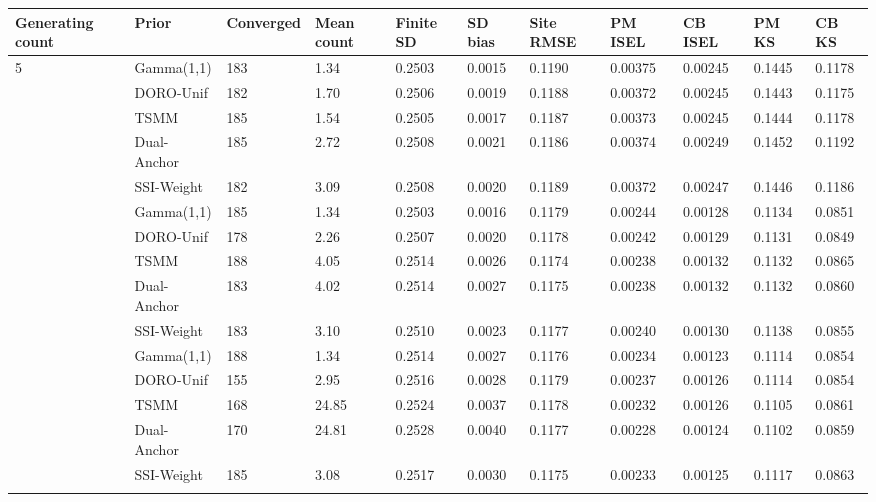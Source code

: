 \begin{longtable}{lllllllllll}
\toprule
Generating count & Prior & Converged & Mean count & Finite SD & SD bias & Site RMSE & PM ISEL & CB ISEL & PM KS & CB KS \\
\midrule\endhead
5 & Gamma(1,1) & 183 & 1.34 & 0.2503 & 0.0015 & 0.1190 & 0.00375 & 0.00245 & 0.1445 & 0.1178 \\ \addlinespace[3pt]
5 & DORO-Unif & 182 & 1.70 & 0.2506 & 0.0019 & 0.1188 & 0.00372 & 0.00245 & 0.1443 & 0.1175 \\ \addlinespace[3pt]
5 & TSMM & 185 & 1.54 & 0.2505 & 0.0017 & 0.1187 & 0.00373 & 0.00245 & 0.1444 & 0.1178 \\ \addlinespace[3pt]
5 & Dual-Anchor & 185 & 2.72 & 0.2508 & 0.0021 & 0.1186 & 0.00374 & 0.00249 & 0.1452 & 0.1192 \\ \addlinespace[3pt]
5 & SSI-Weight & 182 & 3.09 & 0.2508 & 0.0020 & 0.1189 & 0.00372 & 0.00247 & 0.1446 & 0.1186 \\ \addlinespace[3pt]
10 & Gamma(1,1) & 185 & 1.34 & 0.2503 & 0.0016 & 0.1179 & 0.00244 & 0.00128 & 0.1134 & 0.0851 \\ \addlinespace[3pt]
10 & DORO-Unif & 178 & 2.26 & 0.2507 & 0.0020 & 0.1178 & 0.00242 & 0.00129 & 0.1131 & 0.0849 \\ \addlinespace[3pt]
10 & TSMM & 188 & 4.05 & 0.2514 & 0.0026 & 0.1174 & 0.00238 & 0.00132 & 0.1132 & 0.0865 \\ \addlinespace[3pt]
10 & Dual-Anchor & 183 & 4.02 & 0.2514 & 0.0027 & 0.1175 & 0.00238 & 0.00132 & 0.1132 & 0.0860 \\ \addlinespace[3pt]
10 & SSI-Weight & 183 & 3.10 & 0.2510 & 0.0023 & 0.1177 & 0.00240 & 0.00130 & 0.1138 & 0.0855 \\ \addlinespace[3pt]
30 & Gamma(1,1) & 188 & 1.34 & 0.2514 & 0.0027 & 0.1176 & 0.00234 & 0.00123 & 0.1114 & 0.0854 \\ \addlinespace[3pt]
30 & DORO-Unif & 155 & 2.95 & 0.2516 & 0.0028 & 0.1179 & 0.00237 & 0.00126 & 0.1114 & 0.0854 \\ \addlinespace[3pt]
30 & TSMM & 168 & 24.85 & 0.2524 & 0.0037 & 0.1178 & 0.00232 & 0.00126 & 0.1105 & 0.0861 \\ \addlinespace[3pt]
30 & Dual-Anchor & 170 & 24.81 & 0.2528 & 0.0040 & 0.1177 & 0.00228 & 0.00124 & 0.1102 & 0.0859 \\ \addlinespace[3pt]
30 & SSI-Weight & 185 & 3.08 & 0.2517 & 0.0030 & 0.1175 & 0.00233 & 0.00125 & 0.1117 & 0.0863 \\ \addlinespace[3pt]
\bottomrule\end{longtable}
